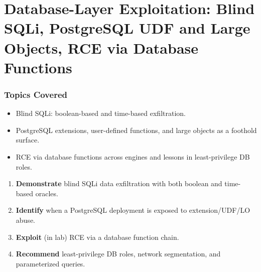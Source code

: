 \documentclass[11pt,letterpaper,oneside]{report}
\begin{document}
\chapter{Database-Layer Exploitation: Blind SQLi, PostgreSQL UDF and Large Objects, RCE via Database Functions}

\subsection*{Topics Covered}
\begin{itemize}
  \item Blind SQLi: boolean-based and time-based exfiltration.
  \item PostgreSQL extensions, user-defined functions, and large objects as a foothold surface.
  \item RCE via database functions across engines and lessons in least-privilege DB roles.
\end{itemize}

\begin{outcomes}
\begin{enumerate}
  \item \textbf{Demonstrate} blind SQLi data exfiltration with both boolean and time-based oracles.
  \item \textbf{Identify} when a PostgreSQL deployment is exposed to extension/UDF/LO abuse.
  \item \textbf{Exploit} (in lab) RCE via a database function chain.
  \item \textbf{Recommend} least-privilege DB roles, network segmentation, and parameterized queries.
\end{enumerate}
\end{outcomes}
\end{document}
